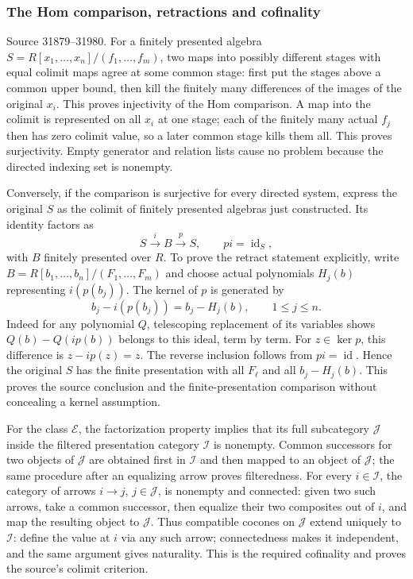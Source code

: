 \subsubsection{The Hom comparison, retractions and cofinality}\label{algebra-proof-036-the-hom-comparison-retractions-and-cofinality}

Source 31879--31980. For a finitely presented algebra \(S=R[x_1,\ldots,x_n]/(f_1,\ldots,f_m)\), two maps into possibly different stages with equal colimit maps agree at some common stage: first put the stages above a common upper bound, then kill the finitely many differences of the images of the original \(x_i\). This proves injectivity of the Hom comparison. A map into the colimit is represented on all \(x_i\) at one stage; each of the finitely many actual \(f_j\) then has zero colimit value, so a later common stage kills them all. This proves surjectivity. Empty generator and relation lists cause no problem because the directed indexing set is nonempty.

Conversely, if the comparison is surjective for every directed system, express the original \(S\) as the colimit of finitely presented algebras just constructed. Its identity factors as \[
S\xrightarrow{i}B\xrightarrow{p}S,\qquad pi=\operatorname{id}_S,
\] with \(B\) finitely presented over \(R\). To prove the retract statement explicitly, write \(B=R[b_1,\ldots,b_n]/(F_1,\ldots,F_m)\) and choose actual polynomials \(H_j(b)\) representing \(i(p(b_j))\). The kernel of \(p\) is generated by \[
b_j-i(p(b_j))=b_j-H_j(b),\qquad 1\le j\le n.
\] Indeed for any polynomial \(Q\), telescoping replacement of its variables shows \(Q(b)-Q(i p(b))\) belongs to this ideal, term by term. For \(z\in\ker p\), this difference is \(z-i p(z)=z\). The reverse inclusion follows from \(pi=\operatorname{id}\). Hence the original \(S\) has the finite presentation with all \(F_\ell\) and all \(b_j-H_j(b)\). This proves the source conclusion and the finite-presentation comparison without concealing a kernel assumption.

For the class \(\mathcal E\), the factorization property implies that its full subcategory \(\mathcal J\) inside the filtered presentation category \(\mathcal I\) is nonempty. Common successors for two objects of \(\mathcal J\) are obtained first in \(\mathcal I\) and then mapped to an object of \(\mathcal J\); the same procedure after an equalizing arrow proves filteredness. For every \(i\in\mathcal I\), the category of arrows \(i\to j\), \(j\in\mathcal J\), is nonempty and connected: given two such arrows, take a common successor, then equalize their two composites out of \(i\), and map the resulting object to \(\mathcal J\). Thus compatible cocones on \(\mathcal J\) extend uniquely to \(\mathcal I\): define the value at \(i\) via any such arrow; connectedness makes it independent, and the same argument gives naturality. This is the required cofinality and proves the source's colimit criterion.

